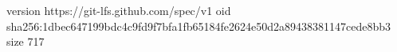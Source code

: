 version https://git-lfs.github.com/spec/v1
oid sha256:1dbec647199bdc4c9fd9f7bfa1fb65184fe2624e50d2a89438381147cede8bb3
size 717
